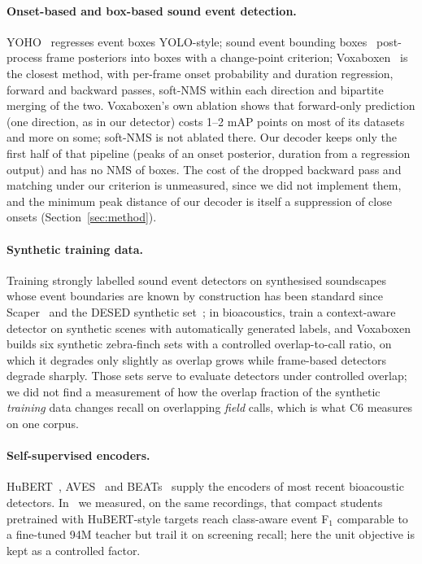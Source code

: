 \documentclass[10pt,twocolumn]{article}
\newcommand{\Fone}{F$_1$}
\begin{document}
\paragraph{Onset-based and box-based sound event detection.} YOHO~\citep{venkatesh2022yoho} regresses event boxes YOLO-style; sound event bounding boxes~\citep{ebbers2024sebbs} post-process frame posteriors into boxes with a change-point criterion; Voxaboxen~\citep{mahon2025voxaboxen} is the closest method, with per-frame onset probability and duration regression, forward and backward passes, soft-NMS within each direction and bipartite merging of the two. Voxaboxen's own ablation shows that forward-only prediction (one direction, as in our detector) costs 1--2 mAP points on most of its datasets and more on some; soft-NMS is not ablated there. Our decoder keeps only the first half of that pipeline (peaks of an onset posterior, duration from a regression output) and has no NMS of boxes. The cost of the dropped backward pass and matching under our criterion is unmeasured, since we did not implement them, and the minimum peak distance of our decoder is itself a suppression of close onsets (Section~\ref{sec:method}).
\paragraph{Synthetic training data.} Training strongly labelled sound event detectors on synthesised soundscapes whose event boundaries are known by construction has been standard since Scaper~\citep{salamon2017scaper} and the DESED synthetic set~\citep{turpault2019desed}; in bioacoustics, \citet{hoffman2025synthetic} train a context-aware detector on synthetic scenes with automatically generated labels, and Voxaboxen builds six synthetic zebra-finch sets with a controlled overlap-to-call ratio, on which it degrades only slightly as overlap grows while frame-based detectors degrade sharply. Those sets serve to evaluate detectors under controlled overlap; we did not find a measurement of how the overlap fraction of the synthetic \emph{training} data changes recall on overlapping \emph{field} calls, which is what C6 measures on one corpus.
\paragraph{Self-supervised encoders.} HuBERT~\citep{hsu2021hubert}, AVES~\citep{hagiwara2023aves} and BEATs~\citep{chen2023beats} supply the encoders of most recent bioacoustic detectors. In~\citep{sheipak2026what} we measured, on the same recordings, that compact students pretrained with HuBERT-style targets reach class-aware event \Fone{} comparable to a fine-tuned 94M teacher but trail it on screening recall; here the unit objective is kept as a controlled factor.
\end{document}
